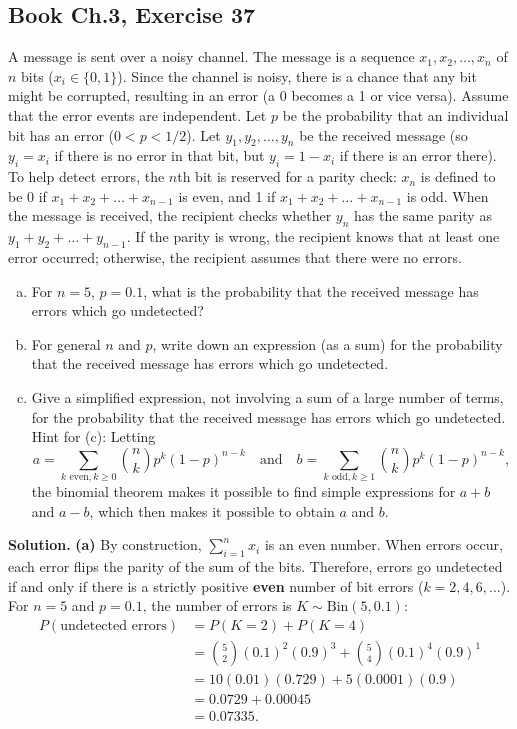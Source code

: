 \documentclass[11pt,a4paper]{article}
\begin{document}
\subsection{Book Ch.3, Exercise 37}
\begin{tcolorbox}[title={Book Ch.3, Exercise 37}]
A message is sent over a noisy channel. The message is a sequence $x_1, x_2, \dots, x_n$ of $n$ bits ($x_i \in \{0, 1\}$). Since the channel is noisy, there is a chance that any bit might be corrupted, resulting in an error (a 0 becomes a 1 or vice versa). Assume that the error events are independent. Let $p$ be the probability that an individual bit has an error ($0 < p < 1/2$). Let $y_1, y_2, \dots, y_n$ be the received message (so $y_i = x_i$ if there is no error in that bit, but $y_i = 1 - x_i$ if there is an error there).
To help detect errors, the $n$th bit is reserved for a parity check: $x_n$ is defined to be 0 if $x_1 + x_2 + \dots + x_{n-1}$ is even, and 1 if $x_1 + x_2 + \dots + x_{n-1}$ is odd. When the message is received, the recipient checks whether $y_n$ has the same parity as $y_1 + y_2 + \dots + y_{n-1}$. If the parity is wrong, the recipient knows that at least one error occurred; otherwise, the recipient assumes that there were no errors.
\begin{enumerate}[(a)]
\item For $n = 5$, $p = 0.1$, what is the probability that the received message has errors which go undetected?
\item For general $n$ and $p$, write down an expression (as a sum) for the probability that the received message has errors which go undetected.
\item Give a simplified expression, not involving a sum of a large number of terms, for the probability that the received message has errors which go undetected.
Hint for (c): Letting
\[
a = \sum_{k \text{ even}, k \ge 0} \binom{n}{k} p^k (1-p)^{n-k} \quad \text{and} \quad b = \sum_{k \text{ odd}, k \ge 1} \binom{n}{k} p^k (1-p)^{n-k},
\]
the binomial theorem makes it possible to find simple expressions for $a+b$ and $a-b$, which then makes it possible to obtain $a$ and $b$.
\end{enumerate}
\end{tcolorbox}

\noindent \textbf{Solution.} \textbf{(a)} By construction, $\sum_{i=1}^{n} x_i$ is an even number. When errors occur, each error flips the parity of the sum of the bits. Therefore, errors go undetected if and only if there is a strictly positive \textbf{even} number of bit errors ($k = 2, 4, 6, \dots$). For $n = 5$ and $p = 0.1$, the number of errors is $K \sim \text{Bin}(5, 0.1)$:
\begin{align*}
P(\text{undetected errors}) &= P(K = 2) + P(K = 4) \\
&= \binom{5}{2} (0.1)^2 (0.9)^3 + \binom{5}{4} (0.1)^4 (0.9)^1 \\
&= 10 (0.01) (0.729) + 5 (0.0001) (0.9) \\
&= 0.0729 + 0.00045 \\
&= 0.07335.
\end{align*}
\end{document}
